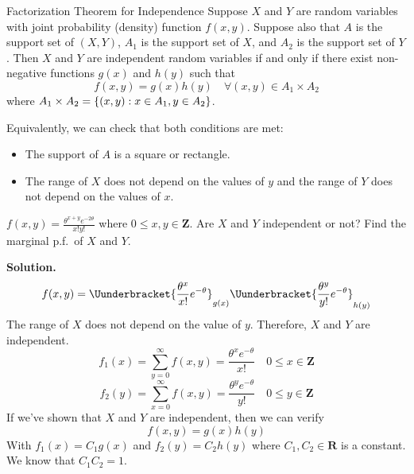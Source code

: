 \begin{Theorem}{Factorization Theorem for Independence}{}
    Suppose $ X $ and $ Y $ are random variables
    with joint probability (density) function $ f(x,y) $. Suppose
    also that $ A $ is the support set of $ (X,Y) $,
    $ A_1 $ is the support set of $ X $,
    and $ A_2 $ is the support set of $ Y $. Then
    $ X $ and $ Y $ are independent random variables
    if and only if there exist non-negative functions
    $ g(x) $ and $ h(y) $ such that
    \[ f(x,y)=g(x)h(y)\quad\forall(x,y)\in A_1\times A_2 \]
    where $ A_1\times A_2=\{(x,y):x\in A_1,y\in A_2\} $.
\end{Theorem}
\begin{Remark}{}{}
    Equivalently, we can check that both conditions are met:
    \begin{itemize}
        \item The support of $ A $ is a square or rectangle.
        \item The range of $ X $ does not depend on the values
              of $ y $ and the range of $ Y $ does not depend on the values of $ x $.
    \end{itemize}
\end{Remark}

\begin{Example}{}{}
    $ \displaystyle f(x,y)=\frac{\theta^{x+y}e^{-2\theta}}{x!y!} $
    where $ 0\le x,y\in\mathbf{Z} $. Are $ X $ and $ Y $
    independent or not? Find the marginal p.f.\ of $ X $ and $ Y $.

    \textbf{Solution.}
    \[ f(x,y)=\Uunderbracket{\frac{\theta^x}{x!} e^{-\theta}}_{g(x)}
        \Uunderbracket{\frac{\theta^y}{y!}e^{-\theta} }_{h(y)} \]
    The range of $ X $ does not depend on the value of $ y $. Therefore,
    $ X $ and $ Y $ are independent.
    \[ f_1(x)=\sum\limits_{y=0}^{\infty} f(x,y)=\frac{\theta^x e^{-\theta}}{x!}\quad 0\le x\in
        \mathbf{Z} \]
    \[ f_2(y)=\sum\limits_{x=0}^{\infty} f(x,y)=\frac{\theta^y e^{-\theta}}{y!}\quad 0\le y\in
        \mathbf{Z} \]
    If we've shown that $ X $ and $ Y $ are independent, then we can verify
    \[ f(x,y)=g(x)h(y) \]
    With $ f_1(x)=C_1 g(x) $ and $ f_2(y)=C_2 h(y) $
    where $ C_1,C_2\in\mathbf{R} $ is a constant. We know that $ C_1C_2=1 $.
\end{Example}

